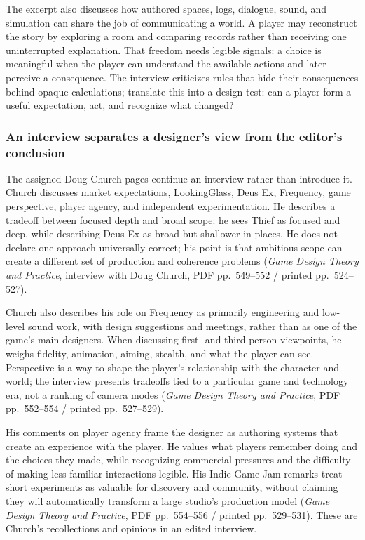The excerpt also discusses how authored spaces, logs, dialogue, sound, and simulation can share the job of communicating a world. A player may reconstruct the story by exploring a room and comparing records rather than receiving one uninterrupted explanation. That freedom needs legible signals: a choice is meaningful when the player can understand the available actions and later perceive a consequence. The interview criticizes rules that hide their consequences behind opaque calculations; translate this into a design test: can a player form a useful expectation, act, and recognize what changed?

\subsubsection{An interview separates a designer's view from the editor's conclusion}\label{05-engine-i-ch009-an-interview-separates-a-designers-view-from-the-editors-conclusion}

The assigned Doug Church pages continue an interview rather than introduce it. Church discusses market expectations, LookingGlass, Deus Ex, Frequency, game perspective, player agency, and independent experimentation. He describes a tradeoff between focused depth and broad scope: he sees Thief as focused and deep, while describing Deus Ex as broad but shallower in places. He does not declare one approach universally correct; his point is that ambitious scope can create a different set of production and coherence problems (\emph{Game Design Theory and Practice}, interview with Doug Church, PDF pp.~549--552 / printed pp.~524--527).

Church also describes his role on Frequency as primarily engineering and low-level sound work, with design suggestions and meetings, rather than as one of the game's main designers. When discussing first- and third-person viewpoints, he weighs fidelity, animation, aiming, stealth, and what the player can see. Perspective is a way to shape the player's relationship with the character and world; the interview presents tradeoffs tied to a particular game and technology era, not a ranking of camera modes (\emph{Game Design Theory and Practice}, PDF pp.~552--554 / printed pp.~527--529).

His comments on player agency frame the designer as authoring systems that create an experience with the player. He values what players remember doing and the choices they made, while recognizing commercial pressures and the difficulty of making less familiar interactions legible. His Indie Game Jam remarks treat short experiments as valuable for discovery and community, without claiming they will automatically transform a large studio's production model (\emph{Game Design Theory and Practice}, PDF pp.~554--556 / printed pp.~529--531). These are Church's recollections and opinions in an edited interview.

